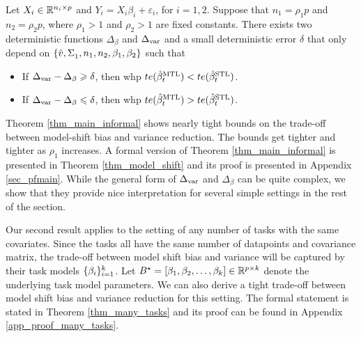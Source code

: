 \begin{theorem}[Informal]\label{thm_main_informal}
	Let $X_i \in\mathbb{R}^{n_i \times p}$ and $Y_i = X_i\beta_i + \varepsilon_i$, for $i = 1, 2$.
	Suppose that $n_1 = \rho_1 p$ and $n_2 = \rho_2 p$, where $\rho_1>1$ and $\rho_2 >1$ are fixed constants.
	There exists two deterministic functions $\Delta_{\beta}$ and $\Delta_{\text{var}}$ and a small deterministic error $\delta$ that only depend on $\{\hat{v}, \Sigma_1^{}, n_1, n_2, \beta_1, \beta_2\}$ such that
	\begin{itemize}
		\item If $\Delta_{\text{var}} - \Delta_{\beta} \geqslant \delta$, then whp $te(\hat{\beta}_t^{\text{MTL}}) < te(\hat{\beta}_t^{\text{STL}})$.
		\item If $\Delta_{\text{var}} - \Delta_{\beta} \leqslant \delta$, then whp $te(\hat{\beta}_t^{\text{MTL}}) > te(\hat{\beta}_t^{\text{STL}})$.
	\end{itemize}
\end{theorem}

Theorem \ref{thm_main_informal} shows nearly tight bounds on the trade-off between model-shift bias and variance reduction.
The bounds get tighter and tighter as $\rho_1$ increases.
A formal version of Theorem \ref{thm_main_informal} is presented in Theorem \ref{thm_model_shift} and its proof is presented in Appendix \ref{sec_pfmain}.
While the general form of $\Delta_{\text{var}}$ and $\Delta_{\beta}$ can be quite complex, we show that they provide nice interpretation for several simple settings in the rest of the section.

Our second result applies to the setting of any number of tasks with the same covariates.
Since the tasks all have the same number of datapoints and covariance matrix, the trade-off between model shift bias and variance will be captured by their task models $\{\beta_i\}_{i=1}^k$.
Let $B^{\star} = [\beta_1, \beta_2, \dots, \beta_k] \in\mathbb{R}^{p\times k}$ denote the underlying task model parameters.
We can also derive a tight trade-off between model shift bias and variance reduction for this setting.
The formal statement is stated in Theorem \ref{thm_many_tasks} and its proof can be found in Appendix \ref{app_proof_many_tasks}.


